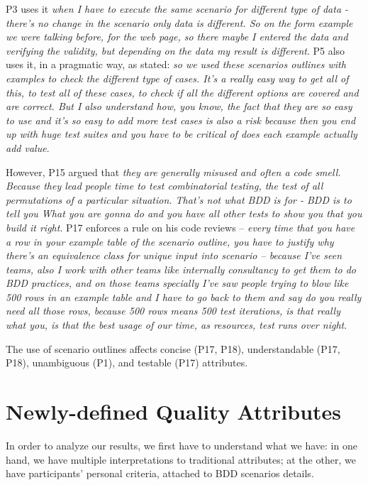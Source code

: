 P3 uses it \textit{when I have to execute the same scenario for different type of data - there's no change in the scenario only data is different. So on the form example we were talking before, for the web page, so there maybe I entered the data and verifying the validity, but depending on the data my result is different}. P5 also uses it, in a pragmatic way, as stated: \textit{so we used these scenarios outlines with examples to check the different type of cases. It's a really easy way to get all of this, to test all of these cases, to check if all the different options are covered and are correct. But I also understand how, you know, the fact that they are so easy to use and it's so easy to add more test cases is also a risk because then you end up with huge test suites and you have to be critical of does each example actually add value}.

However, P15 argued that \textit{they are generally misused and often a code smell. Because they lead people time to test combinatorial testing, the test of all permutations of a particular situation. That's not what BDD is for - BDD is to tell you \textit{What} you are gonna do and you have all other tests to show you that you build it right}. P17 enforces a rule on his code reviews -- \textit{every time that you have a row in your example table of the scenario outline, you have to justify why there's an equivalence class for unique input into scenario -- because I've seen teams, also I work with other teams like internally consultancy to get them to do BDD practices, and on those teams specially I've saw people trying to blow like 500 rows in an example table and I have to go back to them and say \textit{do you really need all those rows, because 500 rows means 500 test iterations, is that really what you, is that the best usage of our time, as resources, test runs over night}}.

The use of scenario outlines affects concise (P17, P18), understandable (P17, P18), unambiguous (P1), and testable (P17) attributes.

\section{\label{chap:chap4_analysis}Newly-defined Quality Attributes}

In order to analyze our results, we first have to understand what we have: in one hand, we have multiple interpretations to traditional attributes; at the other, we have participants' personal criteria, attached to BDD scenarios details.

